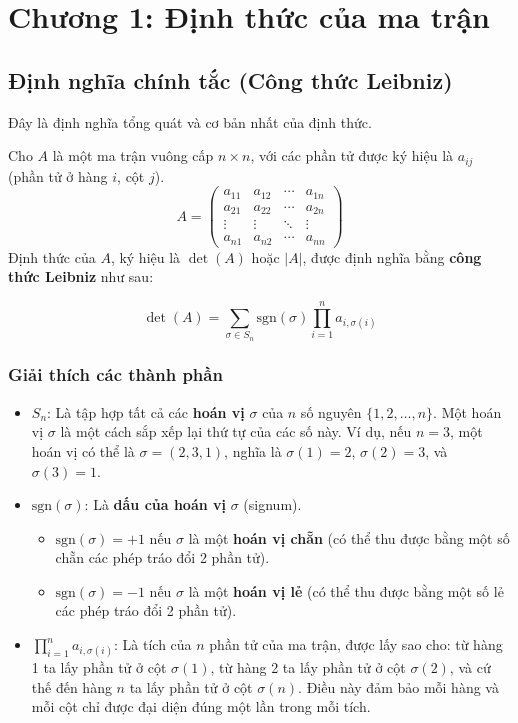 
\chapter{Chương 1: Định thức của ma trận}

\section{Định nghĩa chính tắc (Công thức Leibniz)}

Đây là định nghĩa tổng quát và cơ bản nhất của định thức.

Cho $A$ là một ma trận vuông cấp $n \times n$, với các phần tử được ký hiệu là $a_{ij}$ (phần tử ở hàng $i$, cột $j$).
$$ A = \begin{pmatrix}
a_{11} & a_{12} & \cdots & a_{1n} \\
a_{21} & a_{22} & \cdots & a_{2n} \\
\vdots & \vdots & \ddots & \vdots \\
a_{n1} & a_{n2} & \cdots & a_{nn}
\end{pmatrix} $$
Định thức của $A$, ký hiệu là $\det(A)$ hoặc $|A|$, được định nghĩa bằng \textbf{công thức Leibniz} như sau:

$$ \det(A) = \sum_{\sigma \in S_n} \text{sgn}(\sigma) \prod_{i=1}^{n} a_{i, \sigma(i)} $$

\subsection*{Giải thích các thành phần}
\begin{itemize}
    \item \textbf{$S_n$}: Là tập hợp tất cả các \textbf{hoán vị} $\sigma$ của $n$ số nguyên $\{1, 2, \dots, n\}$. Một hoán vị $\sigma$ là một cách sắp xếp lại thứ tự của các số này. Ví dụ, nếu $n=3$, một hoán vị có thể là $\sigma = (2, 3, 1)$, nghĩa là $\sigma(1)=2$, $\sigma(2)=3$, và $\sigma(3)=1$.
    
    \item \textbf{$\text{sgn}(\sigma)$}: Là \textbf{dấu của hoán vị} $\sigma$ (signum).
    \begin{itemize}
        \item $\text{sgn}(\sigma) = +1$ nếu $\sigma$ là một \textbf{hoán vị chẵn} (có thể thu được bằng một số chẵn các phép tráo đổi 2 phần tử).
        \item $\text{sgn}(\sigma) = -1$ nếu $\sigma$ là một \textbf{hoán vị lẻ} (có thể thu được bằng một số lẻ các phép tráo đổi 2 phần tử).
    \end{itemize}
    
    \item \textbf{$\prod_{i=1}^{n} a_{i, \sigma(i)}$}: Là tích của $n$ phần tử của ma trận, được lấy sao cho: từ hàng 1 ta lấy phần tử ở cột $\sigma(1)$, từ hàng 2 ta lấy phần tử ở cột $\sigma(2)$, và cứ thế đến hàng $n$ ta lấy phần tử ở cột $\sigma(n)$. Điều này đảm bảo mỗi hàng và mỗi cột chỉ được đại diện đúng một lần trong mỗi tích.
\end{itemize}


